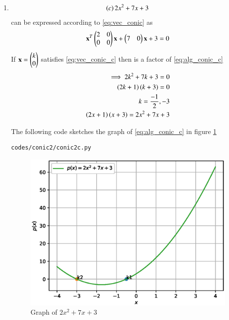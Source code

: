 \begin{enumerate}[label=\thesection.\arabic*.,ref=\thesection.\theenumi]
\item 
\begin{align}
\label{eq:alg_conic_c}
\left(c\right) 2x^{2} + 7x +3
\end{align}
can be expressed according to \ref{eq:vec_conic} as 
\begin{align}
\label{eq:vec_conic_c}
\mathbf{x}^T \begin{pmatrix}2 & 0\\0 & 0\end{pmatrix}\mathbf{x}+ \begin{pmatrix}7 & 0\end{pmatrix}\mathbf{x} +3 =0
\end{align}
If $\mathbf{x}=\begin{pmatrix}k\\0\end{pmatrix}$ satisfies \ref{eq:vec_conic_c} then  is a factor of \ref{eq:alg_conic_c}
\begin{align}
\implies 
2k^{2}+7k+3=0
\\
\left(2k+1\right)\left(k+3\right)=0
\\
k=\frac{-1}{2},-3
\\
\left(2x+1\right)\left(x+3\right)= 2x^{2} + 7x +3
\end{align}

The following code sketches the graph of \ref{eq:alg_conic_c} in figure \ref{fig:conic2c}
\begin{lstlisting}
codes/conic2/conic2c.py
\end{lstlisting}
\begin{figure}[!ht]
\centering
\includegraphics[width=\columnwidth]{./codes/conic2/pyfigs/conic2c.eps}
\caption{Graph of $2x^{2} + 7x +3$}
\label{fig:conic2c}
\end{figure}



\end{enumerate}

